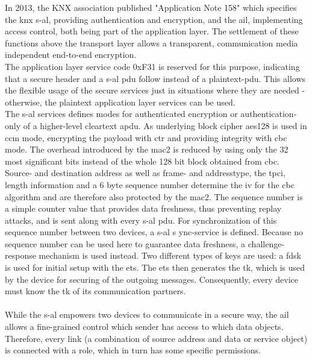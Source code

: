 In 2013, the KNX association published "Application Note 158" \cite{knx_data_sec} which specifies the \gls{knx} \gls{s-al}, providing
authentication and encryption, and the \gls{ail}, implementing access control, both being part of the application layer.
The settlement of these functions above the transport layer allows a transparent, communication media independent end-to-end encryption.
\\
The application layer service code 0xF31 is reserved for this purpose, indicating that a secure header and a \gls{s-al} \gls{pdu} 
follow instead of a plaintext-\gls{pdu}. This allows the flexible usage of the secure services just in situations where they are needed - otherwise, the plaintext application
layer services can be used.
\\
The \gls{s-al} services defines modes for authenticated encryption or authentication-only of a higher-level cleartext \gls{apdu}. As underlying block cipher
\gls{aes}128 is used in \gls{ccm} mode, encrypting the payload with \gls{ctr} and providing integrity with \gls{cbc} mode. The overhead introduced by the 
\gls{mac2} is reduced by 
using only the 32 most significant bits instead of the whole 128 bit block obtained from \gls{cbc}. Source- and destination address as well as
frame- and addresstype, the \gls{tpci}, length information and a 6 byte sequence number determine the \gls{iv} for the \gls{cbc} algorithm and are therefore also protected by the \gls{mac2}.
The sequence number is a simple counter value that provides data freshness, thus preventing replay attacks, and is sent along with every \gls{s-al} \gls{pdu}.
For synchronization of this sequence number between two devices, a \gls{s-al} s	ync-service is defined. Because no sequence number can be used here to guarantee
data freshness, a challenge-response mechanism is used instead.
Two different types of keys are used: a \gls{fdsk} is used for initial setup with the \gls{ets}. The \gls{ets} then generates the \gls{tk}, which is used by the
device for securing of the outgoing messages. Consequently, every device must know the \gls{tk} of its communication partners.
\\
\\
While the \gls{s-al} empowers two devices to communicate in a secure way, the \gls{ail} allows a fine-grained control which sender has access to which
data objects. Therefore, every link (a combination of source address and data or service object) is connected with a role, which in turn
has some specific permissions. 

